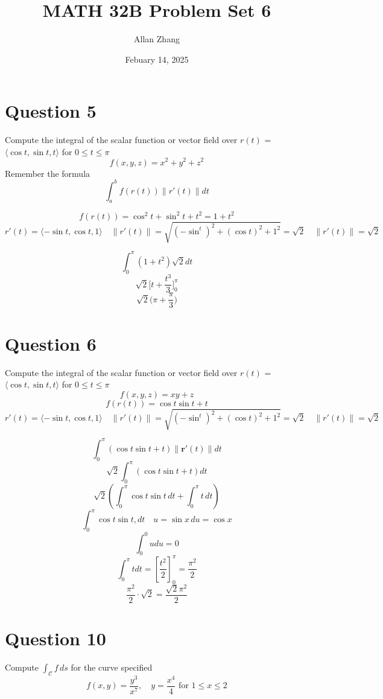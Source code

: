 \documentclass[hidelinks]{article}
\title{\textbf{MATH 32B Problem Set 6}}
\author{Allan Zhang}
\date{Febuary 14, 2025}
\begin{document}
\hypersetup{bookmarksnumbered=true,}
\pagecolor{white}
\color{black}
\maketitle

\section*{Question 5}
Compute the integral of the scalar function or vector field over $r(t)$ = $\langle \cos t, \sin t, t \rangle$ for $0 \leq t \leq \pi$
\[
    f(x, y,z) = x^2+y^2+z^2
\]
Remember the formula
\[
    \int_a^b f(r(t)) \|r'(t)\| dt
\]

\[
    f(r(t)) = \cos^2 t + \sin^2 t + t^2 = 1 + t^2 
\]
\[
    r'(t) = \langle -\sin t, \cos t, 1 \rangle \quad
    \|r'(t)\| = \sqrt{(-\sin^t)^2 + (\cos t)^2  + 1^2} = \sqrt{2} \quad 
    \|r'(t)\| = \sqrt{2}
\]

\[
    \int_0^\pi (1+t^2) \sqrt{2} dt 
\]
\[
    \sqrt{2}\Big [ t + \frac{t^3}{3} \Big ]^\pi_0
\]
\[
    \sqrt{2}\Big(\pi + \frac{\pi}{3} \Big)
\]
\newpage
\section*{Question 6}
Compute the integral of the scalar function or vector field over $r(t)$ = $\langle \cos t, \sin t, t \rangle$ for $0 \leq t \leq \pi$
\[
    f(x,y,z) = xy + z 
\]
\[
    f(r(t)) = \cos t \sin t + t  
\]
\[
    r'(t) = \langle -\sin t, \cos t, 1 \rangle \quad
    \|r'(t)\| = \sqrt{(-\sin^t)^2 + (\cos t)^2  + 1^2} = \sqrt{2} \quad 
    \|r'(t)\| = \sqrt{2}
\]

\[
\int_0^\pi (\cos t \sin t + t) \|\mathbf{r}'(t)\| dt
\]
\[
\sqrt{2} \int_0^\pi (\cos t \sin t + t) dt
\]
\[
\sqrt{2} \left( \int_0^\pi \cos t \sin t \, dt + \int_0^\pi t \, dt \right)
\]
\[
\int_0^\pi \cos t \sin t , dt \quad u = \sin x \, du = \cos x 
\]
\[
    \int_0^0 u du = 0
\]
\[
\int_0^\pi t dt = \left[ \frac{t^2}{2} \right]_0^\pi = \frac{\pi^2}{2}
\]
\[
    \frac{\pi^2}{2} \cdot \sqrt{2} = 
\frac{\sqrt{2} \pi^2}{2}
\]
\newpage
\section*{Question 10}
Compute $\int_\mathcal{C} f \, ds$ for the curve specified
\[
    f(x,y) = \frac{y^3}{x^7}, \quad y = \frac{x^4}{4} \text{ for } 1 \leq x \leq 2
\]
\end{document}

